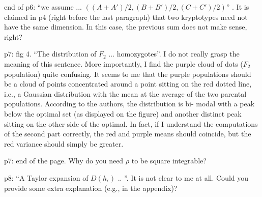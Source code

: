 \begin{point}{end of p6:} 
    ``we assume ... $((A + A' )/2, (B + B' )/2, (C + C' )/2)$'' . It is claimed in p4 (right
before the last paragraph) that two kryptotypes need not have the same dimension. In this
case, the previous sum does not make sense, right?
\end{point}


\begin{point}{p7: fig 4.}
    ``The distribution of $F_2$ ... homozygotes''. I do not really grasp the meaning of this
sentence. More importantly, I find the purple cloud of dots ($F_2$ population) quite confusing.
It seems to me that the purple populations should be a cloud of points concentrated around
a point sitting on the red dotted line, i.e., a Gaussian distribution with the mean at the
average of the two parental populations. According to the authors, the distribution is bi-
modal with a peak below the optimal set (as displayed on the figure) and another distinct
peak sitting on the other side of the optimal. In fact, if I understand the computations of
the second part correctly, the red and purple means should coincide, but the red variance
should simply be greater.
\end{point}


\begin{point}{p7: end of the page.}
    Why do you need $\rho$ to be square integrable?
\end{point}


\begin{point}{p8:}
    ``A Taylor expansion of $D(h_\epsilon)$ .. ''. It is not clear to me at all. Could you provide some
extra explanation (e.g., in the appendix)?
\end{point}


